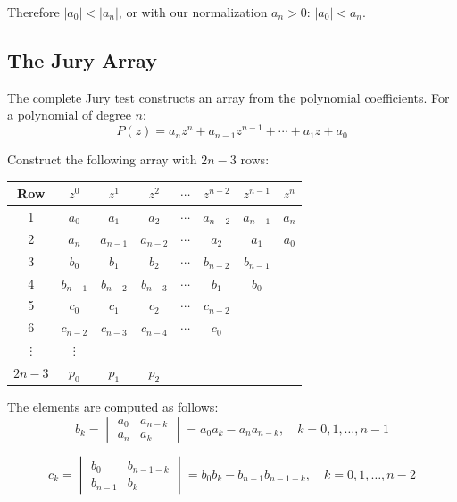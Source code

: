 Therefore $|a_0| < |a_n|$, or with our normalization $a_n > 0$: $|a_0| < a_n$.

\subsection{The Jury Array}

The complete Jury test constructs an array from the polynomial coefficients. For a polynomial of degree $n$:
\begin{equation}
P(z) = a_n z^n + a_{n-1} z^{n-1} + \cdots + a_1 z + a_0
\end{equation}

Construct the following array with $2n - 3$ rows:

\begin{center}
\begin{tabular}{c|ccccccc}
Row & $z^0$ & $z^1$ & $z^2$ & $\cdots$ & $z^{n-2}$ & $z^{n-1}$ & $z^n$ \\
\hline
1 & $a_0$ & $a_1$ & $a_2$ & $\cdots$ & $a_{n-2}$ & $a_{n-1}$ & $a_n$ \\
2 & $a_n$ & $a_{n-1}$ & $a_{n-2}$ & $\cdots$ & $a_2$ & $a_1$ & $a_0$ \\
\hline
3 & $b_0$ & $b_1$ & $b_2$ & $\cdots$ & $b_{n-2}$ & $b_{n-1}$ & \\
4 & $b_{n-1}$ & $b_{n-2}$ & $b_{n-3}$ & $\cdots$ & $b_1$ & $b_0$ & \\
\hline
5 & $c_0$ & $c_1$ & $c_2$ & $\cdots$ & $c_{n-2}$ & & \\
6 & $c_{n-2}$ & $c_{n-3}$ & $c_{n-4}$ & $\cdots$ & $c_0$ & & \\
\hline
$\vdots$ & $\vdots$ & & & & & & \\
\hline
$2n-3$ & $p_0$ & $p_1$ & $p_2$ & & & & \\
\end{tabular}
\end{center}

The elements are computed as follows:
\begin{equation}
b_k = \begin{vmatrix} a_0 & a_{n-k} \\ a_n & a_k \end{vmatrix} = a_0 a_k - a_n a_{n-k}, \quad k = 0, 1, \ldots, n-1
\end{equation}

\begin{equation}
c_k = \begin{vmatrix} b_0 & b_{n-1-k} \\ b_{n-1} & b_k \end{vmatrix} = b_0 b_k - b_{n-1} b_{n-1-k}, \quad k = 0, 1, \ldots, n-2
\end{equation}

